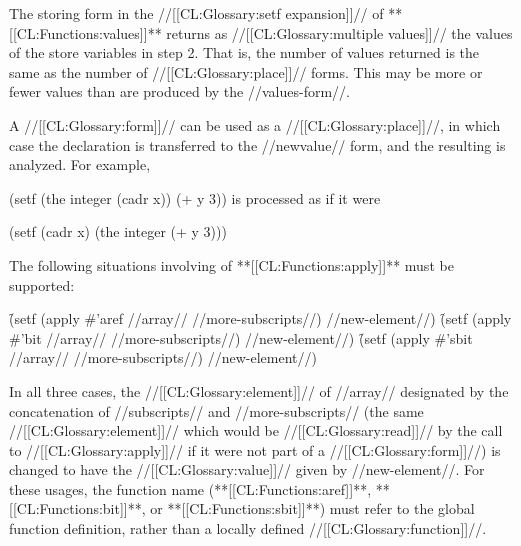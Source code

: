 The storing form in the //[[CL:Glossary:setf expansion]]// of **[[CL:Functions:values]]** returns as //[[CL:Glossary:multiple values]]// the values of the store variables in step 2.  That is, the number of values returned is the same as the number of //[[CL:Glossary:place]]// forms.  This may be more or fewer values than are produced by the //values-form//.

\endsubsubsection%


A  //[[CL:Glossary:form]]// can be used as a //[[CL:Glossary:place]]//, in which case the declaration is transferred to the //newvalue// form, and the resulting  is analyzed.  For example,

\code
 (setf (the integer (cadr x)) (+ y 3)) \endcode is processed as if it were

\code
 (setf (cadr x) (the integer (+ y 3))) \endcode

\endsubsubsection%
          

The following situations involving  of **[[CL:Functions:apply]]** must be supported:

\beginlist \itemitem{\bull} \f{(setf (apply \#'aref //array// 				         					//more-subscripts//) 			  //new-element//)} \itemitem{\bull} \f{(setf (apply \#'bit //array//  				        				       //more-subscripts//) 			  //new-element//)} \itemitem{\bull} \f{(setf (apply \#'sbit //array//  					 					//more-subscripts//)  			  //new-element//)} \endlist

In all three cases, the //[[CL:Glossary:element]]// of //array// designated by the concatenation of //subscripts// and //more-subscripts// (\ie the same //[[CL:Glossary:element]]// which would be //[[CL:Glossary:read]]// by the call to
     //[[CL:Glossary:apply]]// if it were not part of a  //[[CL:Glossary:form]]//) is changed to have the //[[CL:Glossary:value]]// given by //new-element//.  For these usages, the function name (**[[CL:Functions:aref]]**, **[[CL:Functions:bit]]**, or **[[CL:Functions:sbit]]**) must refer to the global function definition, rather than a locally defined //[[CL:Glossary:function]]//.


